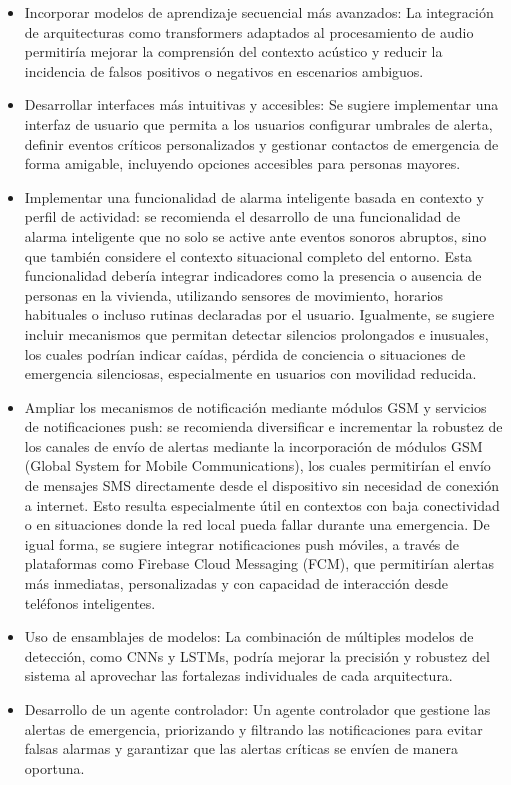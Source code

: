 
\begin{itemize}
  \item Incorporar modelos de aprendizaje secuencial más avanzados: La integración de arquitecturas como transformers adaptados al procesamiento de audio permitiría mejorar la comprensión del contexto acústico y reducir la incidencia de falsos positivos o negativos en escenarios ambiguos.
  \item Desarrollar interfaces más intuitivas y accesibles: Se sugiere implementar una interfaz de usuario que permita a los usuarios configurar umbrales de alerta, definir eventos críticos personalizados y gestionar contactos de emergencia de forma amigable, incluyendo opciones accesibles para personas mayores.
  \item Implementar una funcionalidad de alarma inteligente basada en contexto y perfil de actividad: se recomienda el desarrollo de una funcionalidad de alarma inteligente que no solo se active ante eventos sonoros abruptos, sino que también considere el contexto situacional completo del entorno. Esta funcionalidad debería integrar indicadores como la presencia o ausencia de personas en la vivienda, utilizando sensores de movimiento, horarios habituales o incluso rutinas declaradas por el usuario. Igualmente, se sugiere incluir mecanismos que permitan detectar silencios prolongados e inusuales, los cuales podrían indicar caídas, pérdida de conciencia o situaciones de emergencia silenciosas, especialmente en usuarios con movilidad reducida.
  \item Ampliar los mecanismos de notificación mediante módulos GSM y servicios de notificaciones push: se recomienda diversificar e incrementar la robustez de los canales de envío de alertas mediante la incorporación de módulos GSM (Global System for Mobile Communications), los cuales permitirían el envío de mensajes SMS directamente desde el dispositivo sin necesidad de conexión a internet. Esto resulta especialmente útil en contextos con baja conectividad o en situaciones donde la red local pueda fallar durante una emergencia. De igual forma, se sugiere integrar notificaciones push móviles, a través de plataformas como Firebase Cloud Messaging (FCM), que permitirían alertas más inmediatas, personalizadas y con capacidad de interacción desde teléfonos inteligentes.
  \item Uso de ensamblajes de modelos: La combinación de múltiples modelos de detección, como CNNs y LSTMs, podría mejorar la precisión y robustez del sistema al aprovechar las fortalezas individuales de cada arquitectura.
  \item Desarrollo de un agente controlador: Un agente controlador que gestione las alertas de emergencia, priorizando y filtrando las notificaciones para evitar falsas alarmas y garantizar que las alertas críticas se envíen de manera oportuna.
\end{itemize}